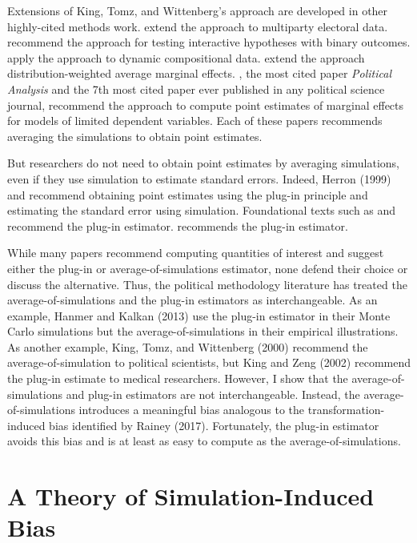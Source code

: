\documentclass[12pt]{article}
\begin{document}
Extensions of King, Tomz, and Wittenberg's approach are developed in other highly-cited methods work. \cite{Tomz2002} extend the approach to multiparty electoral data. \cite{BerryDeMerittEsarey2010} recommend the approach for testing interactive hypotheses with binary outcomes. \cite{Philips2016} apply the approach to dynamic compositional data. \cite{Zhirnov2022} extend the approach distribution-weighted average marginal effects. \cite{BramborClarkGolder2006}, the most cited paper \textit{Political Analysis} and the 7th most cited paper ever published in any political science journal, recommend the approach to compute point estimates of marginal effects for models of limited dependent variables. Each of these papers recommends averaging the simulations to obtain point estimates.

But researchers do not need to obtain point estimates by averaging simulations, even if they use simulation to estimate standard errors. Indeed, Herron (1999) and \cite{KingZeng2002} recommend obtaining point estimates using the plug-in principle and estimating the standard error using simulation. Foundational texts such as \citet[pp.\@ 320--321]{CasellaBerger2002} and \citet[p.\@ 521]{Greene2012} recommend the plug-in estimator. \cite{King1989} recommends the plug-in estimator. 

While many papers recommend computing quantities of interest and suggest either the plug-in or average-of-simulations estimator, none defend their choice or discuss the alternative. Thus, the political methodology literature has treated the average-of-simulations and the plug-in estimators as interchangeable. As an example, Hanmer and Kalkan (2013) use the plug-in estimator in their Monte Carlo simulations but the average-of-simulations in their empirical illustrations. As another example, King, Tomz, and Wittenberg (2000) recommend the average-of-simulation to political scientists, but King and Zeng (2002) recommend the plug-in estimate to medical researchers. However, I show that the average-of-simulations and plug-in estimators are not interchangeable. Instead, the average-of-simulations introduces a meaningful bias analogous to the transformation-induced bias identified by Rainey (2017). Fortunately, the plug-in estimator avoids this bias and is at least as easy to compute as the average-of-simulations.



\section*{A Theory of Simulation-Induced Bias}
\end{document}
